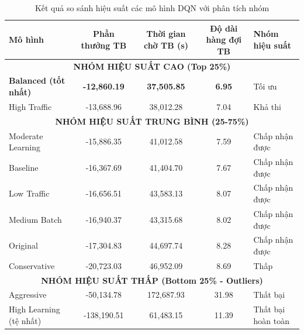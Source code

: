 \begin{table}[!htp]
    \centering
    \caption{Kết quả so sánh hiệu suất các mô hình DQN với phân tích nhóm}
    \label{tab:model_performance_comparison}
    \begin{tabular}{|l|c|c|c|l|}
        \hline 
        \textbf{Mô hình}  & \textbf{Phần thưởng TB} & \textbf{Thời gian chờ TB (s)} & \textbf{Độ dài hàng đợi TB} & \textbf{Nhóm hiệu suất} \\
        \hline 
        \multicolumn{5}{|c|}{\textbf{NHÓM HIỆU SUẤT CAO (Top 25\%)}} \\
        \hline
        \textbf{Balanced (tốt nhất)} & \textbf{-12,860.19}     & \textbf{37,505.85}            & \textbf{6.95}               & Tối ưu \\
        \hline
        High Traffic               & -13,688.96              & 38,012.28                     & 7.04                        & Khả thi \\
        \hline
        \multicolumn{5}{|c|}{\textbf{NHÓM HIỆU SUẤT TRUNG BÌNH (25-75\%)}} \\
        \hline
        Moderate Learning          & -15,886.35              & 41,012.58                     & 7.59                        & Chấp nhận được \\
        \hline
        Baseline                   & -16,367.69              & 41,404.70                     & 7.67                        & Chấp nhận được \\
        \hline
        Low Traffic                & -16,656.51              & 43,583.13                     & 8.07                        & Chấp nhận được \\
        \hline
        Medium Batch               & -16,940.37              & 43,315.68                     & 8.02                        & Chấp nhận được \\
        \hline
        Original                   & -17,304.83              & 44,697.74                     & 8.28                        & Chấp nhận được \\
        \hline
        Conservative               & -20,723.03              & 46,952.09                     & 8.69                        & Thấp \\
        \hline
        \multicolumn{5}{|c|}{\textbf{NHÓM HIỆU SUẤT THẤP (Bottom 25\% - Outliers)}} \\
        \hline
        Aggressive                 & -50,134.78              & 172,687.93                    & 31.98                       & Thất bại \\
        \hline
        High Learning (tệ nhất)              & -138,190.51             & 61,483.15                     & 11.39                       & Thất bại hoàn toàn \\
        \hline
    \end{tabular}
\end{table}

